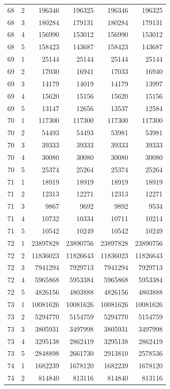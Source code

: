 \begin{longtable}{rrrrrr}
68 & 2 & 196346 & 196325 & 196346 & 196325 \\
68 & 3 & 180284 & 179131 & 180284 & 179131 \\
68 & 4 & 156990 & 153012 & 156990 & 153012 \\
68 & 5 & 158423 & 143687 & 158423 & 143687 \\
69 & 1 & 25144 & 25144 & 25144 & 25144 \\
69 & 2 & 17030 & 16941 & 17033 & 16940 \\
69 & 3 & 14179 & 14019 & 14179 & 13997 \\
69 & 4 & 15620 & 15156 & 15620 & 15156 \\
69 & 5 & 13147 & 12656 & 13537 & 12584 \\
70 & 1 & 117300 & 117300 & 117300 & 117300 \\
70 & 2 & 54493 & 54493 & 53981 & 53981 \\
70 & 3 & 39333 & 39333 & 39333 & 39333 \\
70 & 4 & 30080 & 30080 & 30080 & 30080 \\
70 & 5 & 25374 & 25264 & 25374 & 25264 \\
71 & 1 & 18919 & 18919 & 18919 & 18919 \\
71 & 2 & 12313 & 12271 & 12313 & 12271 \\
71 & 3 & 9867 & 9692 & 9892 & 9534 \\
71 & 4 & 10732 & 10334 & 10711 & 10214 \\
71 & 5 & 10542 & 10249 & 10542 & 10249 \\
72 & 1 & 23897828 & 23890756 & 23897828 & 23890756 \\
72 & 2 & 11836023 & 11826643 & 11836023 & 11826643 \\
72 & 3 & 7941294 & 7929713 & 7941294 & 7929713 \\
72 & 4 & 5965868 & 5953384 & 5965868 & 5953384 \\
72 & 5 & 4826156 & 4803888 & 4826156 & 4803888 \\
73 & 1 & 10081626 & 10081626 & 10081626 & 10081626 \\
73 & 2 & 5294770 & 5154759 & 5294770 & 5154759 \\
73 & 3 & 3805931 & 3497998 & 3805931 & 3497998 \\
73 & 4 & 3295138 & 2862419 & 3295138 & 2862419 \\
73 & 5 & 2848898 & 2661730 & 2913810 & 2578536 \\
74 & 1 & 1682239 & 1678120 & 1682239 & 1678120 \\
74 & 2 & 814840 & 813116 & 814840 & 813116 \\

\end{longtable}
